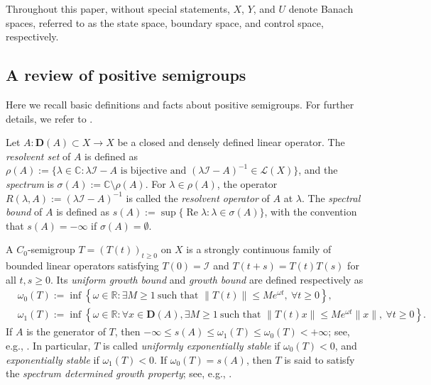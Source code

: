 \documentclass[onecolumn]{autart}
\numberwithin{equation}{section}
\begin{document}
    Throughout this paper, without special statements, $X$, $Y$, and $U$ denote Banach spaces, referred to as the state space, boundary space, and control space, respectively.
	
	\subsection{A review of positive semigroups}\label{Sec:2.1}
	Here we recall basic definitions and facts about positive semigroups. For further details, we refer to \cite{BFR,Nagel}.
	
	Let $A:\bm{D}(A) \subset X \to X$ be a closed and densely defined linear operator. The \emph{resolvent set} of $A$ is defined as
	$\rho(A) := \{\lambda\in \mathbb{C}:\lambda \mathcal{I}-A \text{ is bijective and } (\lambda \mathcal{I}-A)^{-1} \in \mathcal{L}(X)\}$,
	and the \emph{spectrum} is $\sigma(A) := \mathbb{C} \setminus \rho(A)$. For $\lambda \in \rho(A)$, the operator $R(\lambda, A) := (\lambda \mathcal{I}-A)^{-1}$ is called the \emph{resolvent operator} of $A$ at $\lambda$.
	The \emph{spectral bound} of $A$ is defined as $s(A) := \sup\{\operatorname{Re} \lambda : \lambda \in \sigma(A)\}$, with the convention that $s(A) = -\infty$ if $\sigma(A) = \emptyset$.
	
	A $C_0$-semigroup $T = (T(t))_{t \ge 0}$ on $X$ is a strongly continuous family of bounded linear operators satisfying $T(0) = \mathcal{I}$ and $T(t+s) = T(t)T(s)$ for all $t, s \ge 0$. Its \emph{uniform growth bound} and \emph{growth bound} are defined respectively as
	\begin{align*}
		&\omega_0(T) :=  \inf\left\{\omega \in \mathbb{R}:   \exists M \ge 1\ \text{such\ that\ } \|T(t)\| \le Me^{\omega t}, \ \forall t \ge 0\right\} , \\
		&\omega_1(T) := \inf\left\{\omega \in \mathbb{R} : \forall x\in {\bm D}(A), \exists M \ge 1 \ \text{such\ that\ }  \|T(t)x\| \le Me^{\omega t}\|x\|,\ \forall t \ge 0\right\}.
	\end{align*}
	If $A$ is the generator of $T$, then $-\infty\le s(A) \le \omega_1(T) \le \omega_0(T)< +\infty $; see, e.g., \cite{EN}. In particular, $T$ is called \emph{uniformly exponentially stable} if $\omega_0(T) < 0$, and \emph{exponentially stable} if $\omega_1(T) < 0$. If $\omega_0(T) = s(A)$, then $T$ is said to satisfy the \emph{spectrum determined growth property}; see, e.g., \cite[p.~161]{CZ}.
\end{document}
